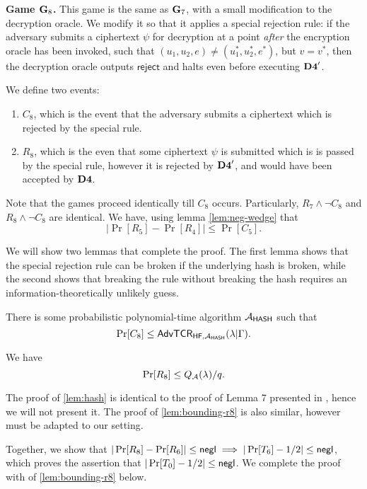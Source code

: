 \textbf{Game $\mathbf{G}_8$.} This game is the same as $\mathbf{G}_7$, with a small modification to the decryption oracle. We modify it so that it applies a special rejection rule: if the adversary submits a ciphertext $\psi$ for decryption at a point \textit{after} the encryption oracle has been invoked, such that $(u_1, u_2, e)\neq (u_1^{*}, u_2^{*}, e^{*})$, but $v = v^{*}$, then the decryption oracle outputs $\mathsf{reject}$ and halts even before executing $\mathbf{D4}'$.

We define two events:
\begin{enumerate}
	\item $C_8$, which is the event that the adversary submits a ciphertext which is rejected by the special rule.
	\item $R_8$, which is the even that some ciphertext $\psi$ is submitted which is is passed by the special rule, however it is rejected by $\mathbf{D4}'$, and would have been accepted by $\mathbf{D4}$.
\end{enumerate}

Note that the games proceed identically till $C_8$ occurs. Particularly, $R_7\wedge\neg C_8$ and $R_8\wedge\neg C_8$ are identical. We have, using lemma \cref{lem:neg-wedge} that
$$|\Pr[R_5]-\Pr[R_4]|\leq\Pr[C_5].$$

We will show two lemmas that complete the proof. The first lemma shows that the special rejection rule can be broken if the underlying hash is broken, while the second shows that breaking the rule without breaking the hash requires an information-theoretically unlikely guess.

\begin{lemma}
	\label{lem:hash}
	There is some probabilistic polynomial-time algorithm $\mathcal{A}_\mathsf{HASH}$ such that $$\Pr[C_8]\leq\mathsf{AdvTCR}_{\mathsf{HF},\mathcal{A}_\mathsf{HASH}}(\lambda|\Gamma).$$
\end{lemma}

\begin{lemma}
	\label{lem:bounding-r8}
	We have $$\Pr[R_8]\leq Q_{\mathcal{A}}(\lambda)/q.$$
\end{lemma}

The proof of \cref{lem:hash} is identical to the proof of Lemma 7 presented in \cite{cs01}, hence we will not present it. The proof of \cref{lem:bounding-r8} is also similar, however must be adapted to our setting. 

Together, we show that $|\Pr[R_8]-\Pr[R_6]|\leq\mathsf{negl}\implies|\Pr[T_6]-1/2|\leq\mathsf{negl}$, which proves the assertion that $|\Pr[T_0]-1/2|\leq\mathsf{negl}$. We complete the proof with of \cref{lem:bounding-r8} below.

